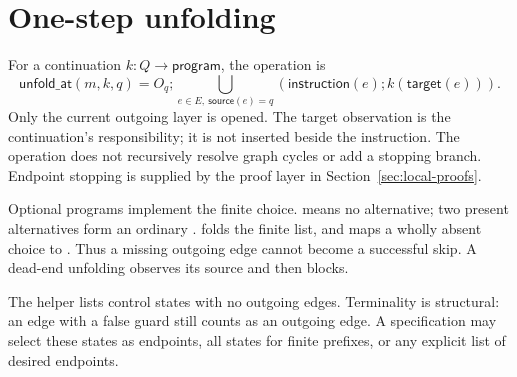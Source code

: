 \section{One-step unfolding}\label{sec:compiler}
For a continuation $k:Q\to\mathsf{program}$, the operation is
\[
 \mathsf{unfold\_at}(m,k,q)=O_q;
 \mathop{\bigcup}_{e\in E,\ \mathsf{source}(e)=q}
    (\mathsf{instruction}(e);k(\mathsf{target}(e))).
\]
Only the current outgoing layer is opened. The target observation is the
continuation's responsibility; it is not inserted beside the instruction.
The operation does not recursively resolve graph cycles or add a stopping
branch. Endpoint stopping is supplied by the proof layer in
Section~\ref{sec:local-proofs}.

Optional programs implement the finite choice.  means no
alternative; two present alternatives form an ordinary .
 folds the finite list, and  maps a
wholly absent choice to . Thus a missing outgoing edge
cannot become a successful skip. A dead-end unfolding observes its source
and then blocks.

The helper  lists control states with no outgoing
edges. Terminality is structural: an edge with a false guard still counts
as an outgoing edge. A specification may select these states as endpoints,
all states for finite prefixes, or any explicit list of desired endpoints.
